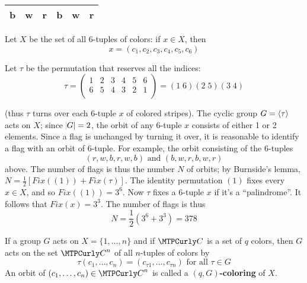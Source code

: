 \documentclass[11pt]{article}
\begin{document}
\begin{center}
\begin{tabular}{|c|c|c|c|c|c|}
\hline
b & w & r & b & w & r\\
\hline
\end{tabular}
\end{center}

Let \(X\) be the set of all 6-tuples of colors: if \(x\in X\), then
\begin{equation*}
x=(c_1,c_2,c_3,c_4,c_5,c_6)
\end{equation*}

Let \(\tau\) be the permutation that reserves all the indices:
\[
\tau=\begin{pmatrix}
 1 & 2 & 3 & 4 & 5 & 6 \\
 6 & 5 & 4 & 3 & 2 & 1 \\
\end{pmatrix}=(1\;6)(2\;5)(3\;4)
\]

(thus \(\tau\) turns over each 6-tuple \(x\) of colored stripes). The cyclic group
\(G=\langle\tau\rangle\) acts on \(X\); since \(\abs{G}=2\), the orbit of any 6-tuple \(x\)
consists of either 1 or 2 elements. Since a flag is unchanged by turning it
over, it is reasonable to identify a flag with an orbit of 6-tuple. For example,
the orbit consisting of the 6-tuples
\begin{equation*}
(r,w,b,r,w,b)\text{ and }(b,w,r,b,w,r)
\end{equation*}
above. The number of flags is thus the number \(N\) of orbits; by Burnside's
lemma, \(N=\frac{1}{2}[Fix((1))+Fix(\tau)]\). The identity permutation \((1)\) fixes
every \(x\in X\), and so \(Fix((1))=3^6\). Now \(\tau\) fixes a 6-tuple \(x\) if it's a
``palindrome''. It follows that \(Fix(x)=3^3\). The number of flags is thus
\begin{equation*}
N=\frac{1}{2}(3^6+3^3)=378
\end{equation*}

\begin{definition}[]
If a group \(G\) acts on \(X=\{1,\dots,n\}\) and if \(\calc\) is a set of \(q\) colors,
then \(G\) acts on the set \(\calc^n\) of all \(n\)-tuples of colors by
\begin{equation*}
\tau(c_1,\dots,c_n)=(c_{\tau1},\dots,c_{\tau n})\text{ for all }\tau\in G
\end{equation*}
An orbit of \((c_1,\dots,c_n)\in\calc^n\) is called a \textbf{\((q,G)\)-coloring} of \(X\).
\end{definition}
\end{document}
